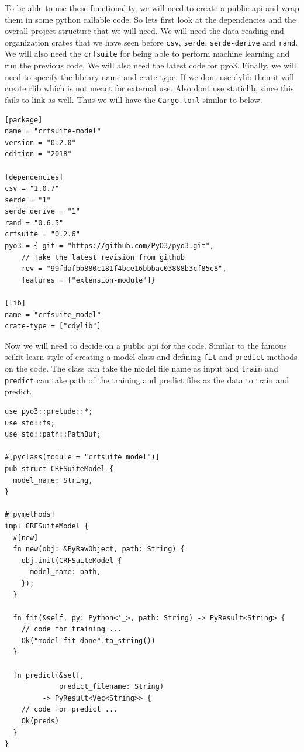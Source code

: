 \documentclass{book}
\begin{document}
To be able to use these functionality, we will need to create a public api and wrap them in some python callable code. So lets first look at the dependencies and the overall project structure that we will need. We will need the data reading and organization crates that we have seen before \lstinline{csv}, \lstinline{serde}, \lstinline{serde-derive} and \lstinline{rand}. We will also need the \lstinline{crfsuite} for being able to perform machine learning and run the previous code. We will also need the latest code for pyo3. Finally, we will need to specify the library name and crate type. If we dont use dylib then it will create rlib which is not meant for external use. Also dont use staticlib, since this fails to link as well. Thus we will have the \lstinline{Cargo.toml} similar to below.

\begin{lstlisting}[caption={chapter8/crfsuite-model/Cargo.toml}, basicstyle=\small]
[package]
name = "crfsuite-model"
version = "0.2.0"
edition = "2018"

[dependencies]
csv = "1.0.7"
serde = "1"
serde_derive = "1"
rand = "0.6.5"
crfsuite = "0.2.6"
pyo3 = { git = "https://github.com/PyO3/pyo3.git",
    // Take the latest revision from github
    rev = "99fdafbb880c181f4bce16bbbac03888b3cf85c8",
    features = ["extension-module"]}

[lib]
name = "crfsuite_model"
crate-type = ["cdylib"]
\end{lstlisting}

Now we will need to decide on a public api for the code. Similar to the famous scikit-learn style of creating a model class and defining \lstinline{fit} and \lstinline{predict} methods on the code. The class can take the model file name as input and \lstinline{train} and \lstinline{predict} can take path of the training and predict files as the data to train and predict.

\begin{lstlisting}[caption={chapter8/crfsuite-model/src/lib.rs}, basicstyle=\small]
use pyo3::prelude::*;
use std::fs;
use std::path::PathBuf;

#[pyclass(module = "crfsuite_model")]
pub struct CRFSuiteModel {
  model_name: String,
}

#[pymethods]
impl CRFSuiteModel {
  #[new]
  fn new(obj: &PyRawObject, path: String) {
    obj.init(CRFSuiteModel {
      model_name: path,
    });
  }

  fn fit(&self, py: Python<'_>, path: String) -> PyResult<String> {
    // code for training ...
    Ok("model fit done".to_string())
  }

  fn predict(&self,
             predict_filename: String)
	     -> PyResult<Vec<String>> {
    // code for predict ...
    Ok(preds)
  }
}
\end{lstlisting}
\end{document}
